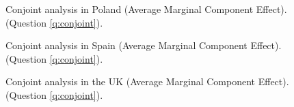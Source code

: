 \begin{figure}[h!]
    \caption[Conjoint analysis in Poland]{Conjoint analysis in Poland (Average Marginal Component Effect). (Question \ref{q:conjoint}).
    }\label{fig:conjoint_PL}
\end{figure}

\begin{figure}[h!]
    \caption[Conjoint analysis in Spain]{Conjoint analysis in Spain (Average Marginal Component Effect). (Question \ref{q:conjoint}).
    }\label{fig:conjoint_ES}
\end{figure}

\begin{figure}[h!]
    \caption[Conjoint analysis in the UK]{Conjoint analysis in the UK (Average Marginal Component Effect). (Question \ref{q:conjoint}).
    }\label{fig:conjoint_GB}
\end{figure}

